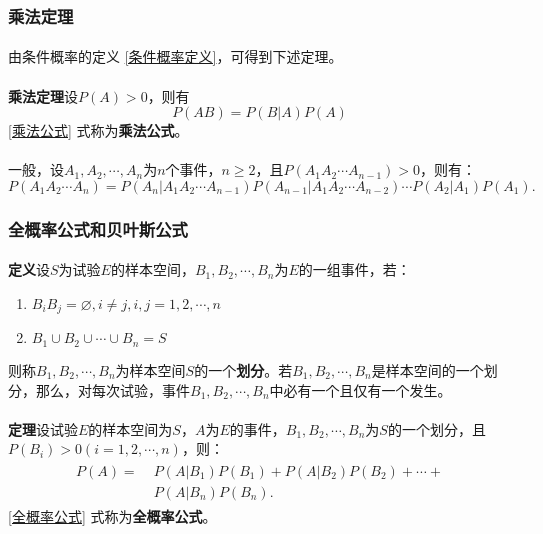 \subsubsection{乘法定理}
\paragraph{}
由条件概率的定义 \hyperref[条件概率定义]{\color{blue} \ref*{条件概率定义}}，可得到下述定理。
\paragraph{}
\textbf{乘法定理\;}设$P(A)>0$，则有
\begin{equation}
  \label{乘法公式}
  P(AB) = P(B|A)P(A)
\end{equation}
\eqref{乘法公式} 式称为\textbf{乘法公式}。
\paragraph{}
一般，设$A_1, A_2, \cdots, A_n$为$n$个事件，$n \geq 2$，且$P(A_1A_2\cdots A_{n-1}) > 0$，则有：
\begin{equation}
  P(A_1A_2\cdots A_n) = P(A_n|A_1A_2\cdots A_{n-1})P(A_{n-1}|A_1A_2\cdots A_{n-2})\cdots P(A_2|A_1)P(A_1).
\end{equation}

\subsubsection{全概率公式和贝叶斯公式}
\paragraph{}
\textbf{定义\;}设$S$为试验$E$的样本空间，$B_1, B_2, \cdots, B_n$为$E$的一组事件，若：
\begin{enumerate}
  \item $B_iB_j=\varnothing, i \neq j, i,j = 1,2,\cdots,n$
  \item $B_1 \cup B_2 \cup \cdots \cup B_n = S$
\end{enumerate}
则称$B_1,B_2,\cdots,B_n$为样本空间$S$的一个\textbf{划分}。若$B_1,B_2,\cdots,B_n$是样本空间的一个划分，那么，对每次试验，事件$B_1,B_2,\cdots,B_n$中必有一个且仅有一个发生。

\paragraph{}
\textbf{定理\;}设试验$E$的样本空间为$S$，$A$为$E$的事件，$B_1,B_2,\cdots,B_n$为$S$的一个划分，且$P(B_i)>0(i=1,2,\cdots,n)$，则：
\begin{align}
  \label{全概率公式}
  \begin{split}
    P(A) =&\; P(A|B_1)P(B_1) + P(A|B_2)P(B_2)+ \cdots + \\
    &\; P(A|B_n)P(B_n).
  \end{split}
\end{align}
\eqref{全概率公式} 式称为\textbf{全概率公式}。

